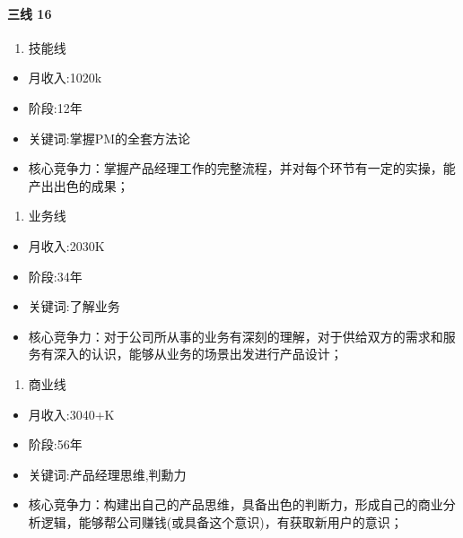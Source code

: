 \documentclass[letterpaper,10pt,english]{sphinxmanual}
\begin{document}
\paragraph{三线 16\sphinxfootnotemark[349]}
\label{\detokenize{chapter_introduction/career_path:id5}}%
\begin{footnotetext}[349]\sphinxAtStartFootnote
{}
%
\end{footnotetext}\ignorespaces \begin{enumerate}
%
\item {} 
技能线

\end{enumerate}
\begin{itemize}
\item {} 
月收入:10\sphinxhyphen{}20k

\item {} 
阶段:1\sphinxhyphen{}2年

\item {} 
关键词:掌握PM的全套方法论

\item {} 
核心竞争力：掌握产品经理工作的完整流程，并对每个环节有一定的实操，能产出出色的成果；

\end{itemize}
\begin{enumerate}
%
\setcounter{enumi}{1}
\item {} 
业务线

\end{enumerate}
\begin{itemize}
\item {} 
月收入:20\sphinxhyphen{}30K

\item {} 
阶段:3\sphinxhyphen{}4年

\item {} 
关键词:了解业务

\item {} 
核心竞争力：对于公司所从事的业务有深刻的理解，对于供给双方的需求和服务有深入的认识，能够从业务的场景出发进行产品设计；

\end{itemize}
\begin{enumerate}
%
\setcounter{enumi}{2}
\item {} 
商业线

\end{enumerate}
\begin{itemize}
\item {} 
月收入:30\sphinxhyphen{}40+K

\item {} 
阶段:5\sphinxhyphen{}6年

\item {} 
关键词:产品经理思维,判勳力

\item {} 
核心竞争力：构建出自己的产品思维，具备出色的判断力，形成自己的商业分析逻辑，能够帮公司赚钱(或具备这个意识)，有获取新用户的意识；

\end{itemize}
\end{document}
